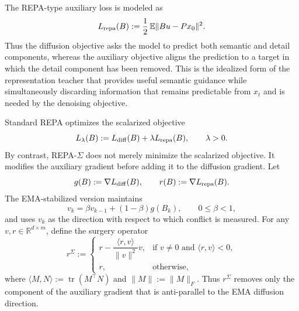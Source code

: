 The REPA-type auxiliary loss is modeled as
\begin{equation}
    L_{\rm repa}(B)
    :=
    \frac12\,\mathbb E\|Bu-Px_0\|^2 .
    \label{eq:linear-repa-loss}
\end{equation}
Thus the diffusion objective asks the model to predict both semantic and detail
components, whereas the auxiliary objective aligns the prediction to a target in
which the detail component has been removed. This is the idealized form of the representation teacher 
that provides useful semantic guidance while simultaneously discarding information that remains
predictable from $x_t$ and is needed by the denoising objective.

Standard REPA optimizes the scalarized objective
\begin{equation}
    L_\lambda(B)
    :=
    L_{\rm diff}(B)+\lambda L_{\rm repa}(B),
    \qquad
    \lambda>0 .
    \label{eq:standard-repa-objective}
\end{equation}
By contrast, REPA-$\Sigma$ does not merely minimize the scalarized objective.
It modifies the auxiliary gradient before adding it to the diffusion gradient.
Let
\[
    g(B) := \nabla L_{\rm diff}(B),
    \qquad
    r(B) := \nabla L_{\rm repa}(B).
\]
The EMA-stabilized version maintains
\begin{equation}
    v_k = \beta v_{k-1} + (1-\beta)g(B_k),
    \qquad
    0\le \beta<1,
    \label{eq:ema-direction}
\end{equation}
and uses $v_k$ as the direction with respect to which conflict is measured. For
any $v,r\in\mathbb R^{d\times m}$, define the surgery operator
\begin{equation}
    r^{\Sigma}
    :=
    \begin{cases}
    r - \dfrac{\langle r,v\rangle}{\|v\|^2}v,
    &\text{if } v\neq0 \text{ and } \langle r,v\rangle<0,\\[1.2em]
    r,
    &\text{otherwise},
    \end{cases}
    \label{eq:sigma-operator}
\end{equation}
where $\langle M,N\rangle:=\operatorname{tr}(M^\top N)$ and
$\|M\|:=\|M\|_F$. Thus $r^{\Sigma}$ removes only the component of the
auxiliary gradient that is anti-parallel to the EMA diffusion direction.

